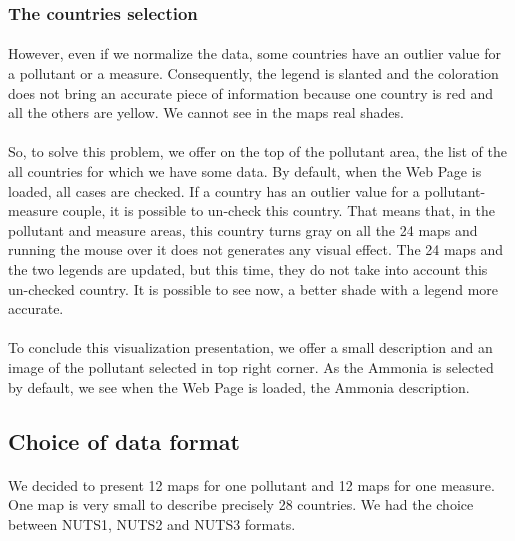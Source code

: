 \documentclass[preprint,journal]{vgtc}       %
\begin{document}
\subsubsection{The countries selection}
\paragraph{}
However, even if we normalize the data, some countries have an outlier value for a pollutant or a measure. Consequently, the legend is slanted and the coloration does not bring an accurate piece of information because one country is red and all the others are yellow. We cannot see in the maps real shades. 
\paragraph{}
So, to solve this problem, we offer on the top of the pollutant area, the list of the all countries for which we have some data. By default, when the Web Page is loaded, all cases are checked. If a country has an outlier value for a pollutant-measure couple, it is possible to un-check this country. 
\newline
That means that, in the pollutant and measure areas, this country turns gray on all the 24 maps and running the mouse over it does not generates any visual effect. The 24 maps and the two legends are updated, but this time, they do not take into account this un-checked country. It is possible to see now, a better shade with a legend more accurate.

\paragraph{}
To conclude this visualization presentation, we offer a small description and an image of the pollutant selected in top right corner. As the Ammonia is selected by default, we see when the Web Page is loaded, the Ammonia description.

\subsection{Choice of data format}
	\paragraph{}
We decided to present 12 maps for one pollutant and 12 maps for one measure. One map is very small to describe precisely 28 countries. We had the choice between NUTS1, NUTS2 and NUTS3 formats.
\end{document}
